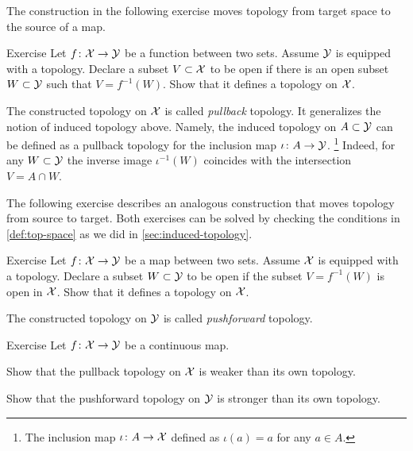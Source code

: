 The construction in the following exercise moves topology from target space to the source of a map.

\begin{thm}{Exercise}\label{ex:move-topology:pullback}
Let $f\colon\mathcal{X}\to\mathcal{Y}$ be a function between two sets.
Assume $\mathcal{Y}$ is equipped with a topology.
Declare a subset $V\subset\mathcal{X}$  to be open if there is an open subset $W\subset\mathcal{Y}$ 
such that $V=f^{-1}(W)$.
Show that it defines a topology on $\mathcal{X}$.
\end{thm}

The constructed topology on $\mathcal{X}$ is called \emph{pullback} topology.
It generalizes the notion of induced topology above.
Namely, the induced topology on $A\subset \mathcal{Y}$ can be defined as a pullback topology for the inclusion map $\iota\colon A\to \mathcal{Y}$.%
\footnote{The inclusion map $\iota\colon A\to \mathcal{X}$ defined as $\iota(a)=a$ for any $a\in A$.}
Indeed, for any $W\subset \mathcal{Y}$ the inverse image $\iota^{-1}(W)$ coincides with the intersection  $V=A\cap W$.

The following exercise describes an analogous construction that moves topology from source to target.
Both exercises can be solved by checking the conditions in \ref{def:top-space} as we did in \ref{sec:induced-topology}.

\begin{thm}{Exercise}\label{ex:move-topology:pushforward}
Let $f\colon\mathcal{X}\to\mathcal{Y}$ be a map between two sets.
Assume $\mathcal{X}$ is equipped with a topology.
Declare a subset $W\subset\mathcal{Y}$ to be open if the subset $V=f^{-1}(W)$ is open in $\mathcal{X}$.
Show that it defines a topology on $\mathcal{X}$.

\end{thm}

The constructed topology on $\mathcal{Y}$ is called \emph{pushforward} topology.

\begin{thm}{Exercise}
Let $f\colon\mathcal{X}\to\mathcal{Y}$ be a continuous map.

\begin{subthm}{}
Show that the pullback topology on $\mathcal{X}$ is weaker than its own topology.
\end{subthm}

\begin{subthm}{}
Show that the pushforward topology on $\mathcal{Y}$ is stronger than its own topology.
\end{subthm}

\end{thm}

